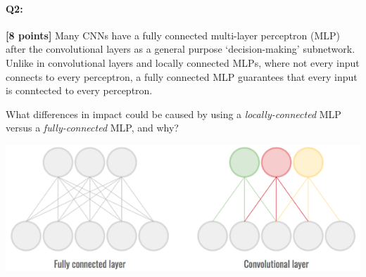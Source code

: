 





\pagebreak
\paragraph{Q2:} \textbf{[8 points]} Many CNNs have a fully connected multi-layer perceptron (MLP) after the convolutional layers as a general purpose `decision-making' subnetwork. Unlike in convolutional layers and locally connected MLPs, where not every input connects to every perceptron, a fully connected MLP guarantees that every input is conntected to every perceptron.

\begin{tcolorbox}[colback=orange!5!white,colframe=orange!75!black]
What differences in impact could be caused by using a \emph{locally-connected} MLP versus a \emph{fully-connected} MLP, and why?
\end{tcolorbox}

\includegraphics[width=\linewidth]{images/q2mlp.png}

